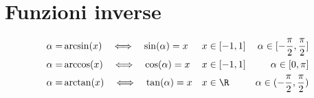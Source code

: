 \section{Funzioni inverse}
\begin{align*}
\alpha=&\arcsin(x)\quad\Longleftrightarrow\quad\sin(\alpha)=x&& x\in[-1,1]&\alpha\in[-\dfrac{\pi}{2},\dfrac{\pi}{2}]\\
\alpha=&\arccos(x)\quad\Longleftrightarrow\quad\cos(\alpha)=x&&x\in[-1,1]&\alpha\in[0,\pi]\\
\alpha=&\arctan(x)\quad\Longleftrightarrow\quad\tan(\alpha)=x&& x\in\R
&\alpha\in(-\dfrac{\pi}{2},\dfrac{\pi}{2})
\end{align*}		